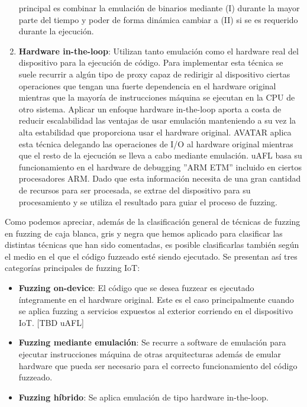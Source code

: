 \begin{enumerate}[I]
    principal es combinar la emulación de binarios mediante (I) durante la mayor parte del tiempo y poder de forma dinámica cambiar a (II) si se es 
    requerido durante la ejecución.
    \item \textbf{Hardware in-the-loop}: Utilizan tanto emulación como el hardware real del dispositivo para la ejecución de código. Para implementar esta 
    técnica se suele recurrir a algún tipo de proxy capaz de redirigir al dispositivo ciertas operaciones que tengan una fuerte dependencia en el hardware
    original mientras que la mayoría de instrucciones máquina se ejecutan en la CPU de otro sistema. Aplicar un enfoque hardware in-the-loop aporta a costa 
    de reducir escalabilidad las ventajas de usar emulación manteniendo a su vez la alta estabilidad que proporciona usar el hardware original.
    AVATAR\cite{Zaddach2014} aplica esta técnica delegando las operaciones de I/O al hardware original mientras que el resto de la ejecución se lleva a 
    cabo mediante emulación. uAFL\cite{uAFL} basa su funcionamiento en el hardware de debugging ''ARM ETM'' incluido en ciertos procesadores ARM. Dado que 
    esta información necesita de una gran cantidad de recursos para ser procesada, se extrae del dispositivo para su procesamiento y se utiliza el resultado
    para guiar el proceso de fuzzing.
\end{enumerate} 

Como podemos apreciar, además de la clasificación general de técnicas de fuzzing en fuzzing de caja blanca, gris y negra que hemos aplicado para clasificar las 
distintas técnicas que han sido comentadas, es posible clasificarlas también según el medio en el que el código fuzzeado esté siendo ejecutado. Se presentan así 
tres categorías principales de fuzzing IoT:
\begin{itemize}
    \item \textbf{Fuzzing on-device}: El código que se desea fuzzear es ejecutado íntegramente en el hardware original. Este es el caso principalmente cuando
    se aplica fuzzing a servicios expuestos al exterior corriendo en el dispositivo IoT. [TBD uAFL]
    \item \textbf{Fuzzing mediante emulación}: Se recurre a software de emulación para ejecutar instrucciones máquina de otras arquitecturas además de 
    emular hardware que pueda ser necesario para el correcto funcionamiento del código fuzzeado.
    \item \textbf{Fuzzing híbrido}: Se aplica emulación de tipo hardware in-the-loop.
\end{itemize}

